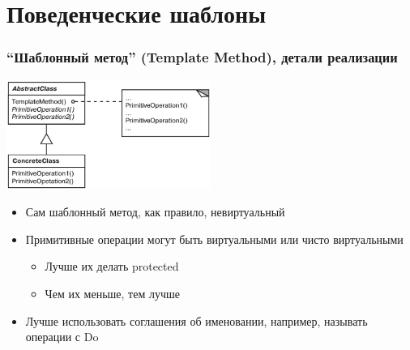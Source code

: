 \documentclass[xetex,mathserif,serif]{beamer}
\begin{document}
	\section{Поведенческие шаблоны}

	\begin{frame}
		\frametitle{``Шаблонный метод'' (Template Method), детали реализации}
		\begin{center}
			\includegraphics[width=0.5\textwidth]{templateMethod.png}
		\end{center}
		\begin{itemize}
			\item Сам шаблонный метод, как правило, невиртуальный
			\item Примитивные операции могут быть виртуальными или чисто виртуальными
			\begin{itemize}
				\item Лучше их делать protected
				\item Чем их меньше, тем лучше
			\end{itemize}
			\item Лучше использовать соглашения об именовании, например, называть операции с Do
		\end{itemize}
	\end{frame}
\end{document}
